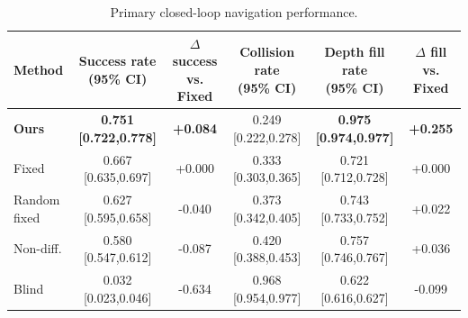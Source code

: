 \begin{table}[t]
\centering
\footnotesize
\renewcommand{\arraystretch}{1.14}
\begin{tabular*}{\textwidth}{@{\extracolsep{\fill}}lccccc@{}}
\toprule
Method & \shortstack{Success rate\\(95\% CI)} & \shortstack{$\Delta$ success\\vs. Fixed} & \shortstack{Collision rate\\(95\% CI)} & \shortstack{Depth fill rate\\(95\% CI)} & \shortstack{$\Delta$ fill\\vs. Fixed} \\
\midrule
\textbf{Ours} & \textbf{0.751 [0.722,0.778]} & \textbf{+0.084} & 0.249 [0.222,0.278] & \textbf{0.975 [0.974,0.977]} & \textbf{+0.255} \\
Fixed & 0.667 [0.635,0.697] & +0.000 & 0.333 [0.303,0.365] & 0.721 [0.712,0.728] & +0.000 \\
Random fixed & 0.627 [0.595,0.658] & -0.040 & 0.373 [0.342,0.405] & 0.743 [0.733,0.752] & +0.022 \\
Non-diff. & 0.580 [0.547,0.612] & -0.087 & 0.420 [0.388,0.453] & 0.757 [0.746,0.767] & +0.036 \\
Blind & 0.032 [0.023,0.046] & -0.634 & 0.968 [0.954,0.977] & 0.622 [0.616,0.627] & -0.099 \\
\bottomrule
\end{tabular*}
\caption{Primary closed-loop navigation performance.}
\label{tab:journal_main_navigation}
\end{table}
